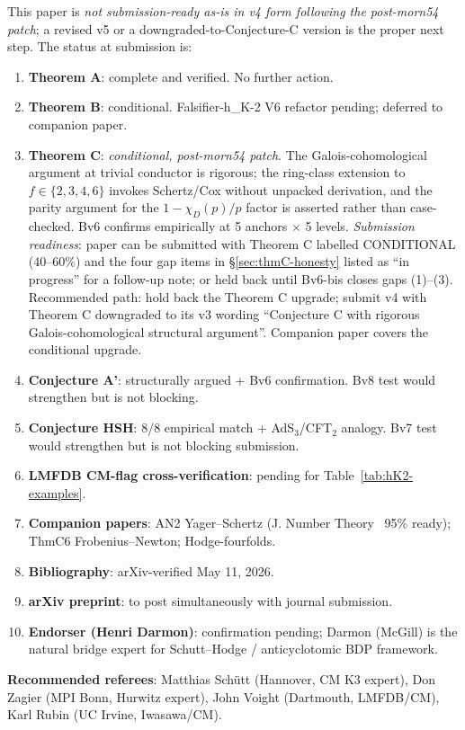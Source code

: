 \documentclass[11pt,a4paper]{amsart}
\theoremstyle{definition}
\begin{document}
This paper is \emph{not submission-ready as-is in v4 form following the post-morn54 patch}; a revised v5 or a downgraded-to-Conjecture-C version is the proper next step. The status at submission is:
\begin{enumerate}[leftmargin=2em]
  \item \textbf{Theorem A}: complete and verified. No further action.
  \item \textbf{Theorem B}: conditional. Falsifier-h\_K-2 V6 refactor pending; deferred to companion paper.
  \item \textbf{Theorem C}: \emph{conditional, post-morn54 patch}. The Galois-cohomological argument at trivial conductor is rigorous; the ring-class extension to $f \in \{2, 3, 4, 6\}$ invokes Schertz/Cox without unpacked derivation, and the parity argument for the $1 - \chi_D(p)/p$ factor is asserted rather than case-checked. Bv6 confirms empirically at 5 anchors $\times$ 5 levels. \emph{Submission readiness}: paper can be submitted with Theorem C labelled CONDITIONAL (40--60\%) and the four gap items in \S\ref{sec:thmC-honesty} listed as ``in progress'' for a follow-up note; or held back until Bv6-bis closes gaps (1)--(3). Recommended path: hold back the Theorem C upgrade; submit v4 with Theorem C downgraded to its v3 wording ``Conjecture C with rigorous Galois-cohomological structural argument''. Companion paper covers the conditional upgrade.
  \item \textbf{Conjecture A'}: structurally argued + Bv6 confirmation. Bv8 test would strengthen but is not blocking.
  \item \textbf{Conjecture HSH}: 8/8 empirical match + AdS$_3$/CFT$_2$ analogy. Bv7 test would strengthen but is not blocking submission.
  \item \textbf{LMFDB CM-flag cross-verification}: pending for Table~\ref{tab:hK2-examples}.
  \item \textbf{Companion papers}: AN2 Yager--Schertz (J. Number Theory ~95\% ready); ThmC6 Frobenius--Newton; Hodge-fourfolds.
  \item \textbf{Bibliography}: arXiv-verified May 11, 2026.
  \item \textbf{arXiv preprint}: to post simultaneously with journal submission.
  \item \textbf{Endorser (Henri Darmon)}: confirmation pending; Darmon (McGill) is the natural bridge expert for Schutt--Hodge / anticyclotomic BDP framework.
\end{enumerate}

\textbf{Recommended referees}: Matthias Sch\"utt (Hannover, CM K3 expert), Don Zagier (MPI Bonn, Hurwitz expert), John Voight (Dartmouth, LMFDB/CM), Karl Rubin (UC Irvine, Iwasawa/CM).
\end{document}
